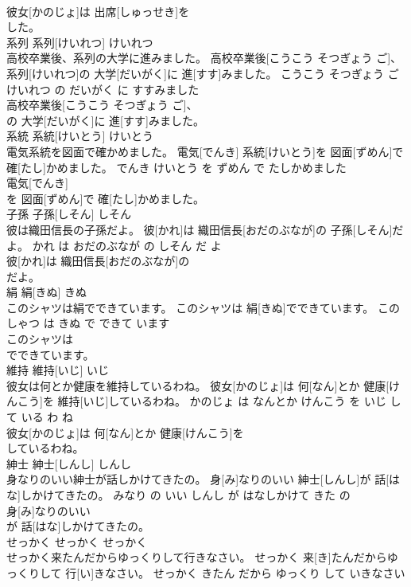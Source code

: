 \documentclass[8pt]{extreport}
\begin{document}
\begin{CJK}{UTF8}{min}
\\	彼女[かのじょ]は 出席[しゅっせき]を
\\	した。			
\\	系列	系列[けいれつ]	けいれつ	
\\	高校卒業後、系列の大学に進みました。	高校卒業後[こうこう そつぎょう ご]、 系列[けいれつ]の 大学[だいがく]に 進[すす]みました。	こうこう そつぎょう ご けいれつ の だいがく に すすみました	
\\	高校卒業後[こうこう そつぎょう ご]、
\\	の 大学[だいがく]に 進[すす]みました。			
\\	系統	系統[けいとう]	けいとう	
\\	電気系統を図面で確かめました。	電気[でんき] 系統[けいとう]を 図面[ずめん]で 確[たし]かめました。	でんき けいとう を ずめん で たしかめました	
\\	電気[でんき]
\\	を 図面[ずめん]で 確[たし]かめました。			
\\	子孫	子孫[しそん]	しそん	
\\	彼は織田信長の子孫だよ。	彼[かれ]は 織田信長[おだのぶなが]の 子孫[しそん]だよ。	かれ は おだのぶなが の しそん だ よ	
\\	彼[かれ]は 織田信長[おだのぶなが]の
\\	だよ。			
\\	絹	絹[きぬ]	きぬ	
\\	このシャツは絹でできています。	このシャツは 絹[きぬ]でできています。	この しゃつ は きぬ で できて います	
\\	このシャツは
\\	でできています。			
\\	維持	維持[いじ]	いじ	
\\	彼女は何とか健康を維持しているわね。	彼女[かのじょ]は 何[なん]とか 健康[けんこう]を 維持[いじ]しているわね。	かのじょ は なんとか けんこう を いじ して いる わ ね	
\\	彼女[かのじょ]は 何[なん]とか 健康[けんこう]を
\\	しているわね。			
\\	紳士	紳士[しんし]	しんし	
\\	身なりのいい紳士が話しかけてきたの。	身[み]なりのいい 紳士[しんし]が 話[はな]しかけてきたの。	みなり の いい しんし が はなしかけて きた の	
\\	身[み]なりのいい
\\	が 話[はな]しかけてきたの。			
\\	せっかく	せっかく	せっかく	
\\	せっかく来たんだからゆっくりして行きなさい。	せっかく 来[き]たんだからゆっくりして 行[い]きなさい。	せっかく きたん だから ゆっくり して いきなさい	

\end{CJK}
\end{document}
